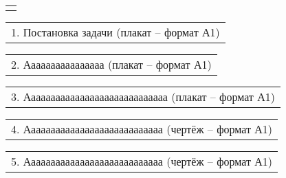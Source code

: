 \documentclass[12pt, А4, twoside]{article}
\begin{document}
\begin{FlushLeft}
    \begin{tabular}{p{17.25cm}}
        \vspace{0pt} \hline \\
    \end{tabular}

    \vspace{-0.1 cm}

    \begin{tabular}{p{17.25cm}}
        \hspace{0.3cm} \textsf{1. Постановка задачи (плакат {--} формат А1)} \vspace{0pt} \hline  \\
    \end{tabular}

    \vspace{-0.1 cm}

    \begin{tabular}{p{17.25cm}}
        \hspace{0.3cm} \textsf{2. Аааааааааааааааа (плакат {--} формат А1)} \vspace{0pt} \hline  \\
    \end{tabular}

    \vspace{-0.1 cm}

    \begin{tabular}{p{17.25cm}}
        \hspace{0.3cm} \textsf{3. Ааааааааааааааааааааааааааааа (плакат {--} формат А1)} \vspace{0pt} \hline  \\
    \end{tabular}

    \vspace{-0.1 cm}

    \begin{tabular}{p{17.25cm}}
        \hspace{0.3cm} \textsf{4. Аааааааааааааааааааааааааааа (чертёж {--} формат А1)} \vspace{0pt} \hline  \\
    \end{tabular}

    \vspace{-0.1 cm}

    \begin{tabular}{p{17.25cm}}
        \hspace{0.3cm} \textsf{5. Аааааааааааааааааааааааааааа (чертёж {--} формат А1)} \vspace{0pt} \hline  \\
    \end{tabular}


\end{FlushLeft}
\end{document}

